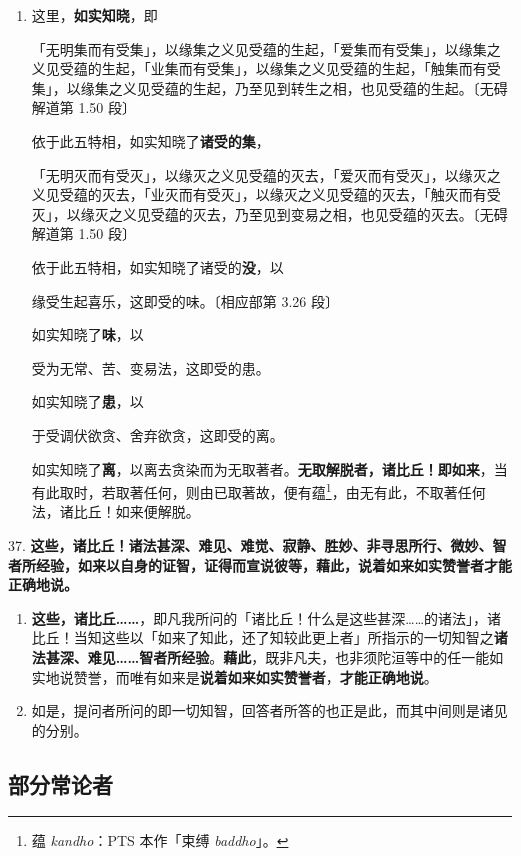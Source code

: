 \begin{enumerate}
\item 这里，\textbf{如实知晓}，即\begin{quoting}「无明集而有受集」，以缘集之义见受蕴的生起，「爱集而有受集」，以缘集之义见受蕴的生起，「业集而有受集」，以缘集之义见受蕴的生起，「触集而有受集」，以缘集之义见受蕴的生起，乃至见到转生之相，也见受蕴的生起。{\bluefootnotesize 〔无碍解道第 1.50 段〕}\end{quoting}依于此五特相，如实知晓了\textbf{诸受的集}，\begin{quoting}「无明灭而有受灭」，以缘灭之义见受蕴的灭去，「爱灭而有受灭」，以缘灭之义见受蕴的灭去，「业灭而有受灭」，以缘灭之义见受蕴的灭去，「触灭而有受灭」，以缘灭之义见受蕴的灭去，乃至见到变易之相，也见受蕴的灭去。{\bluefootnotesize 〔无碍解道第 1.50 段〕}\end{quoting}依于此五特相，如实知晓了诸受的\textbf{没}，以\begin{quoting}缘受生起喜乐，这即受的味。{\bluefootnotesize 〔相应部第 3.26 段〕}\end{quoting}如实知晓了\textbf{味}，以\begin{quoting}受为无常、苦、变易法，这即受的患。\end{quoting}如实知晓了\textbf{患}，以\begin{quoting}于受调伏欲贪、舍弃欲贪，这即受的离。\end{quoting}如实知晓了\textbf{离}，以离去贪染而为无取著者。\textbf{无取解脱者，诸比丘！即如来}，当有此取时，若取著任何，则由已取著故，便有蕴\footnote{蕴 \textit{kandho}：PTS 本作「束缚 \textit{baddho}」。}，由无有此，不取著任何法，诸比丘！如来便解脱。\end{enumerate}

{\Large 37.} \textbf{这些，诸比丘！诸法甚深、难见、难觉、寂静、胜妙、非寻思所行、微妙、智者所经验，如来以自身的证智，证得而宣说彼等，藉此，说着如来如实赞誉者才能正确地说。}

\begin{enumerate}\item \textbf{这些，诸比丘……}，即凡我所问的「诸比丘！什么是这些甚深……的诸法」，诸比丘！当知这些以「如来了知此，还了知较此更上者」所指示的一切知智之\textbf{诸法甚深、难见……智者所经验}。\textbf{藉此}，既非凡夫，也非须陀洹等中的任一能如实地说赞誉，而唯有如来是\textbf{说着如来如实赞誉者}，\textbf{才能正确地说}。
\item 如是，提问者所问的即一切知智，回答者所答的也正是此，而其中间则是诸见的分别。\end{enumerate}

\subsection{部分常论者}

